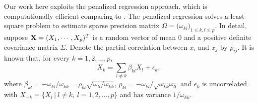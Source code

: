 \documentclass[useAMS,usenatbib,referee]{bio}
\begin{document}
Our work here exploits the penalized regression approach, which is computationally efficient comparing to \citet{Zhao:2014}. The penalized regression solves a least square problem to estimate sparse precision matrix $\Omega=\big(\omega_{kl} \big)_{1\le k,l\le p}$. 
In detail, suppose ${\bf X}= (X_1 ,\cdots, X_p)^T$ is a random vector of mean $0$ and a positive definite covariance matrix $\Sigma$.  
Denote the partial correlation between $x_i$ and $x_j$ by $\rho_{ij}$.
It is known that, for every $k=1,2,\ldots,p$,
\begin{equation} \label{eqn:pcorr_reg}
X_k = \sum_{l \neq k} \beta_{kl} X_l + \epsilon_k,
\end{equation}
where $\beta_{kl}=- \omega_{kl}/\omega_{kk} = \rho_{kl} \sqrt{ \omega_{ll} / \omega_{kk} }$, $\rho_{kl}=-\omega_{kl}/\sqrt{\omega_{kk}\omega_{ll}}$ and $\epsilon_k$ is uncorrelated with $X_{-k}=\{ X_l~|~ l \neq k,~
l=1,2,\ldots,p\}$ and has variance $1/\omega_{kk}$. 
\end{document}
